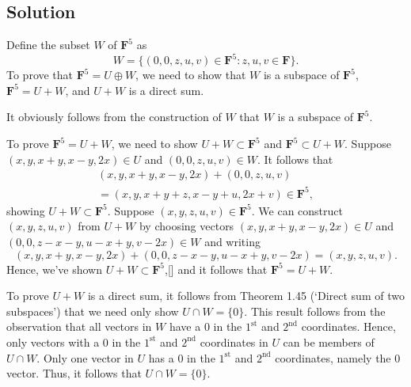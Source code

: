 \documentclass{article}
\begin{document}
\subsection*{Solution}
Define the subset $W$ of $\mathbf{F}^5$ as
\[W=\{(0,0,z,u,v)\in\mathbf{F}^5:z,u,v\in\mathbf{F}\}.\]
To prove that $\mathbf{F}^5=U\oplus W$, we need to show that $W$ is a subspace of $\mathbf{F}^5$, $\mathbf{F}^5=U + W$, and $U+W$ is a direct sum.

It obviously follows from the construction of $W$ that $W$ is a subspace of $\mathbf{F}^5$.

To prove $\mathbf{F}^5=U + W$, we need to show $U + W\subset \mathbf{F}^5$ and $\mathbf{F}^5\subset U+W$. 
Suppose $(x,y,x+y,x-y,2x)\in U$ and $(0,0,z,u,v)\in W$. 
It follows that
\begin{multline*}
(x,y,x+y,x-y,2x)+(0,0,z,u,v)\\
=(x,y,x+y+z,x-y+u,2x+v)\in\mathbf{F}^5,
\end{multline*}
showing $U + W\subset \mathbf{F}^5$. 
Suppose $(x,y,z,u,v)\in\mathbf{F}^5$. 
We can construct $(x,y,z,u,v)$ from $U+W$ by choosing vectors $(x,y,x+y,x-y,2x)\in U$ and $(0,0,z-x-y,u-x+y,v-2x)\in W$ and writing
\[(x,y,x+y,x-y,2x)+(0,0,z-x-y,u-x+y,v-2x)=(x,y,z,u,v).\]
Hence, we've shown $U + W\subset \mathbf{F}^5$,[] and it follows that $\mathbf{F}^5=U + W$.

To prove $U+W$ is a direct sum, it follows from Theorem 1.45 (`Direct sum of two subspaces') that we need only show $U\cap W=\{0\}$. 
This result follows from the observation that all vectors in $W$ have a $0$ in the $1^{\text{st}}$ and $2^{\text{nd}}$ coordinates. 
Hence, only vectors with a $0$ in the $1^{\text{st}}$ and $2^{\text{nd}}$ coordinates in $U$ can be members of $U\cap W$. 
Only one vector in $U$ has a $0$ in the $1^{\text{st}}$ and $2^{\text{nd}}$ coordinates, namely the $0$ vector. Thus, it follows that $U\cap W=\{0\}$.
\end{document}
